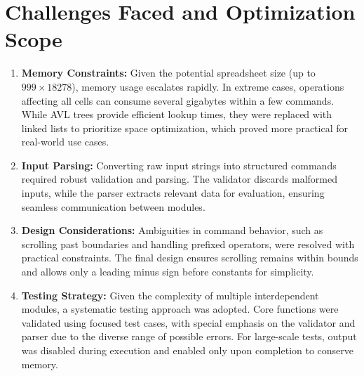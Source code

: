 \documentclass{report}
\begin{document}
\section*{Challenges Faced and Optimization Scope}
\begin{enumerate}
    \item 	\textbf{Memory Constraints:} Given the potential spreadsheet size (up to $999 \times 18278$), memory usage escalates rapidly. In extreme cases, operations affecting all cells can consume several gigabytes within a few commands. While AVL trees provide efficient lookup times, they were replaced with linked lists to prioritize space optimization, which proved more practical for real-world use cases.
    
    \item 	\textbf{Input Parsing:} Converting raw input strings into structured commands required robust validation and parsing. The validator discards malformed inputs, while the parser extracts relevant data for evaluation, ensuring seamless communication between modules.
    
    \item 	\textbf{Design Considerations:} Ambiguities in command behavior, such as scrolling past boundaries and handling prefixed operators, were resolved with practical constraints. The final design ensures scrolling remains within bounds and allows only a leading minus sign before constants for simplicity.
    
    \item 	\textbf{Testing Strategy:} Given the complexity of multiple interdependent modules, a systematic testing approach was adopted. Core functions were validated using focused test cases, with special emphasis on the validator and parser due to the diverse range of possible errors. For large-scale tests, output was disabled during execution and enabled only upon completion to conserve memory.
\end{enumerate}
\end{document}
